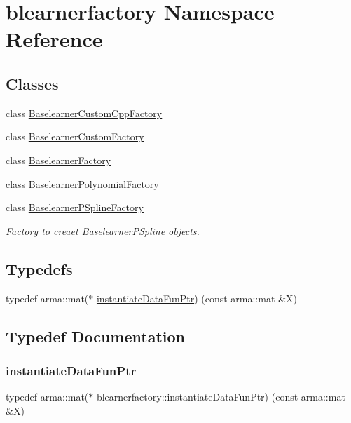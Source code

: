 \hypertarget{namespaceblearnerfactory}{}\section{blearnerfactory Namespace Reference}
\label{namespaceblearnerfactory}
\subsection*{Classes}
\begin{DoxyCompactItemize}
\item 
class \mbox{\hyperlink{classblearnerfactory_1_1_baselearner_custom_cpp_factory}{Baselearner\+Custom\+Cpp\+Factory}}
\item 
class \mbox{\hyperlink{classblearnerfactory_1_1_baselearner_custom_factory}{Baselearner\+Custom\+Factory}}
\item 
class \mbox{\hyperlink{classblearnerfactory_1_1_baselearner_factory}{Baselearner\+Factory}}
\item 
class \mbox{\hyperlink{classblearnerfactory_1_1_baselearner_polynomial_factory}{Baselearner\+Polynomial\+Factory}}
\item 
class \mbox{\hyperlink{classblearnerfactory_1_1_baselearner_p_spline_factory}{Baselearner\+P\+Spline\+Factory}}
\begin{DoxyCompactList}\small\item\em Factory to creaet {\ttfamily Baselearner\+P\+Spline} objects. \end{DoxyCompactList}\end{DoxyCompactItemize}
\subsection*{Typedefs}
\begin{DoxyCompactItemize}
\item 
typedef arma\+::mat($\ast$ \mbox{\hyperlink{namespaceblearnerfactory_a74e80c9723f4fa8866e09a04dfa3035b}{instantiate\+Data\+Fun\+Ptr}}) (const arma\+::mat \&X)
\end{DoxyCompactItemize}


\subsection{Typedef Documentation}
\mbox{\label{namespaceblearnerfactory_a74e80c9723f4fa8866e09a04dfa3035b}} 
\subsubsection{\texorpdfstring{instantiate\+Data\+Fun\+Ptr}{instantiateDataFunPtr}}
{\footnotesize\ttfamily typedef arma\+::mat($\ast$ blearnerfactory\+::instantiate\+Data\+Fun\+Ptr) (const arma\+::mat \&X)}


